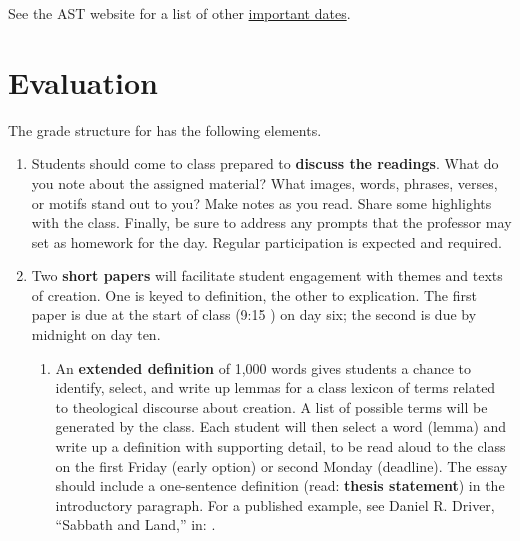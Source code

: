 \documentclass[titlepage]{article}
\begin{document}
See the AST website for a list of other \href{http://www.astheology.ns.ca/students/academic-dates.html}{important dates}.

\section{Evaluation}
\label{evaluation}

The grade structure for \ccode has the following elements.

\begin{enumerate}

	\item Students should come to class prepared to \textbf{discuss the
	readings}. What do you note about the assigned material? What
	images, words, phrases, verses, or motifs stand out to you? Make
	notes as you read. Share some highlights with the class. Finally, be
	sure to address any prompts that the professor may set as homework
	for the day. Regular participation is expected and required.

	\item Two \textbf{short papers} will facilitate student engagement
	with themes and texts of creation. One is keyed to definition, the
	other to explication. The first paper is due at the start of class
	(9:15 \AM) on day six; the second is due by midnight on day ten.




	\begin{enumerate}

		\item An \textbf{extended definition} of 1,000 words gives
		students a chance to identify, select, and write up lemmas for a
		class lexicon of terms related to theological discourse about
		creation. A list of possible terms will be generated by the
		class. Each student will then select a word (lemma) and write up
		a definition with supporting detail, to be read aloud to the
		class on the first Friday (early option) or second Monday
		(deadline). The essay should include a one-sentence definition
		(read: \textbf{thesis statement}) in the introductory paragraph.
		For a published example, see Daniel R. Driver, “Sabbath and
		Land,” in: \cite[21--31]{jg}.
		

\end{enumerate}
\end{enumerate}
\end{document}
